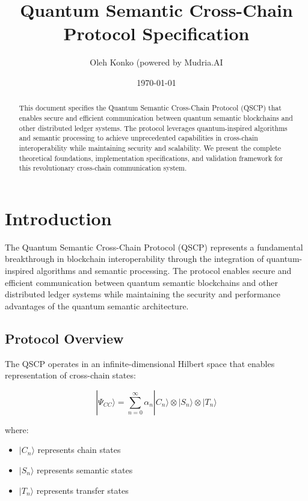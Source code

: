 \documentclass[12pt]{article}
\title{Quantum Semantic Cross-Chain Protocol Specification}
\author{Oleh Konko (powered by Mudria.AI}
\date{\today}
\begin{document}
\maketitle

\begin{abstract}
This document specifies the Quantum Semantic Cross-Chain Protocol (QSCP) that enables secure and efficient communication between quantum semantic blockchains and other distributed ledger systems. The protocol leverages quantum-inspired algorithms and semantic processing to achieve unprecedented capabilities in cross-chain interoperability while maintaining security and scalability. We present the complete theoretical foundations, implementation specifications, and validation framework for this revolutionary cross-chain communication system.
\end{abstract}

\section{Introduction}

The Quantum Semantic Cross-Chain Protocol (QSCP) represents a fundamental breakthrough in blockchain interoperability through the integration of quantum-inspired algorithms and semantic processing. The protocol enables secure and efficient communication between quantum semantic blockchains and other distributed ledger systems while maintaining the security and performance advantages of the quantum semantic architecture.

\subsection{Protocol Overview}

The QSCP operates in an infinite-dimensional Hilbert space that enables representation of cross-chain states:

\begin{equation}
|Ψ_{CC}\rangle = \sum_{n=0}^{\infty} \alpha_n|C_n\rangle \otimes |S_n\rangle \otimes |T_n\rangle
\end{equation}

where:
\begin{itemize}
\item $|C_n\rangle$ represents chain states
\item $|S_n\rangle$ represents semantic states  
\item $|T_n\rangle$ represents transfer states
\end{itemize}
\end{document}
